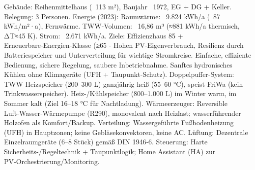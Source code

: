 \markdownRendererDocumentBegin
\markdownRendererSectionBegin
{}\markdownRendererInterblockSeparator
{}\markdownRendererUlBeginTight
\markdownRendererUlItem Gebäude: Reihenmittelhaus (~113 m²), Baujahr ~1972, EG + DG + Keller.\markdownRendererUlItemEnd 
\markdownRendererUlItem Belegung: 3 Personen.\markdownRendererUlItemEnd 
\markdownRendererUlItem Energie (2023):\markdownRendererUlItemEnd 
\markdownRendererUlItem Raumwärme: ~9.824 kWh/a (~87 kWh/m²·a), Fernwärme.\markdownRendererUlItemEnd 
\markdownRendererUlItem TWW‑Volumen: ~16,86 m³ (≈881 kWh/a thermisch, ΔT≈45 K).\markdownRendererUlItemEnd 
\markdownRendererUlItem Strom: ~2.671 kWh/a.\markdownRendererUlItemEnd 
\markdownRendererUlItem Ziele:\markdownRendererUlItemEnd 
\markdownRendererUlItem Effizienzhaus 85 + Erneuerbare‑Energien‑Klasse (≥65 - Hohen PV‑Eigenverbrauch, Resilienz durch Batteriespeicher und Unterverteilung für wichtige Stromkreise.\markdownRendererUlItemEnd 
\markdownRendererUlItem Einfache, effiziente Bedienung, sichere Regelung, saubere Inbetriebnahme.\markdownRendererUlItemEnd 
\markdownRendererUlItem Sanftes hydronisches Kühlen ohne Klimageräte (UFH + Taupunkt‑Schutz).\markdownRendererUlItemEnd 
\markdownRendererUlEndTight \markdownRendererInterblockSeparator
{}\markdownRendererSectionBegin
{}\markdownRendererInterblockSeparator
{}\markdownRendererUlBeginTight
\markdownRendererUlItem Doppelpuffer‑System:\markdownRendererUlItemEnd 
\markdownRendererUlItem TWW‑Heizspeicher (200–300 L) ganzjährig heiß (55–60 °C), speist FriWa (kein Trinkwasserspeicher).\markdownRendererUlItemEnd 
\markdownRendererUlItem Heiz-/Kühlspeicher (800–1.000 L) im Winter warm, im Sommer kalt (Ziel 16–18 °C für Nachtladung).\markdownRendererUlItemEnd 
\markdownRendererUlItem Wärmeerzeuger: Reversible Luft‑Wasser‑Wärmepumpe (R290), monovalent nach Heizlast; wasserführender Holzofen als Komfort/Backup.\markdownRendererUlItemEnd 
\markdownRendererUlItem Verteilung: Wassergeführte Fußbodenheizung (UFH) in Hauptzonen; keine Gebläsekonvektoren, keine AC.\markdownRendererUlItemEnd 
\markdownRendererUlItem Lüftung: Dezentrale Einzelraumgeräte (6–8 Stück) gemäß DIN 1946‑6.\markdownRendererUlItemEnd 
\markdownRendererUlItem Steuerung: Harte Sicherheits‑/Regeltechnik + Taupunktlogik; Home Assistant (HA) zur PV‑Orchestrierung/Monitoring.\markdownRendererUlItemEnd 
\markdownRendererUlEndTight \markdownRendererInterblockSeparator
{}
\markdownRendererSectionEnd \markdownRendererSectionBegin
{}\markdownRendererInterblockSeparator
